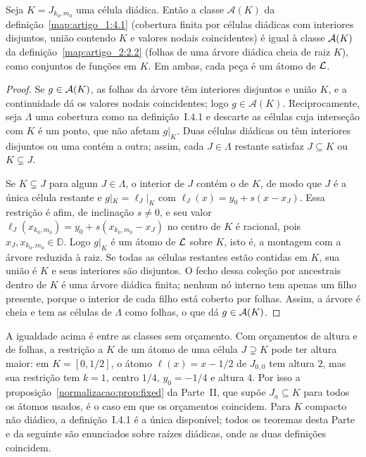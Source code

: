 \begin{proposicaoSN}\label{artigo_2:prop:bridge-part1}
Seja $K=J_{k_0,m_0}$ uma célula diádica. Então a classe $\mathcal A(K)$ da definição~\ref{map:artigo_1:4.1} (cobertura finita por células diádicas com interiores disjuntos, união contendo $K$ e valores nodais coincidentes) é igual à classe $\mathcal{A}(K)$ da definição~\ref{map:artigo_2:2.2} (folhas de uma árvore diádica cheia de raiz $K$), como conjuntos de funções em $K$. Em ambas, cada peça é um átomo de $\mathcal{L}$.
\end{proposicaoSN}
\begin{proof}
Se $g\in\mathcal{A}(K)$, as folhas da árvore têm interiores disjuntos e união $K$, e a continuidade dá os valores nodais coincidentes; logo $g\in\mathcal A(K)$. Reciprocamente, seja $\Lambda$ uma cobertura como na definição~I.4.1 e descarte as células cuja interseção com $K$ é um ponto, que não afetam $g|_K$. Duas células diádicas ou têm interiores disjuntos ou uma contém a outra; assim, cada $J\in\Lambda$ restante satisfaz $J\subseteq K$ ou $K\subsetneq J$.

Se $K\subsetneq J$ para algum $J\in\Lambda$, o interior de $J$ contém o de $K$, de modo que $J$ é a única célula restante e $g|_K=\ell_J|_K$ com $\ell_J(x)=y_0+s(x-x_J)$. Essa restrição é afim, de inclinação $s\ne0$, e seu valor $\ell_J(x_{k_0,m_0})=y_0+s(x_{k_0,m_0}-x_J)$ no centro de $K$ é racional, pois $x_J,x_{k_0,m_0}\in\mathbb D$. Logo $g|_K$ é um átomo de $\mathcal{L}$ sobre $K$, isto é, a montagem com a árvore reduzida à raiz. Se todas as células restantes estão contidas em $K$, sua união é $K$ e seus interiores são disjuntos. O fecho dessa coleção por ancestrais dentro de $K$ é uma árvore diádica finita; nenhum nó interno tem apenas um filho presente, porque o interior de cada filho está coberto por folhas. Assim, a árvore é cheia e tem as células de $\Lambda$ como folhas, o que dá $g\in\mathcal{A}(K)$.
\end{proof}
\begin{observacaoSN}
A igualdade acima é entre as classes sem orçamento. Com orçamentos de altura e de folhas, a restrição a $K$ de um átomo de uma célula $J\supsetneq K$ pode ter altura maior: em $K=[0,1/2]$, o átomo $\ell(x)=x-1/2$ de $J_{0,0}$ tem altura $2$, mas sua restrição tem $k=1$, centro $1/4$, $y_0=-1/4$ e altura $4$. Por isso a proposição~\ref{normalizacao:prop:fixed} da Parte~II, que supõe $J_a\subseteq K$ para todos os átomos usados, é o caso em que os orçamentos coincidem. Para $K$ compacto não diádico, a definição~I.4.1 é a única disponível; todos os teoremas desta Parte e da seguinte são enunciados sobre raízes diádicas, onde as duas definições coincidem.
\end{observacaoSN}

